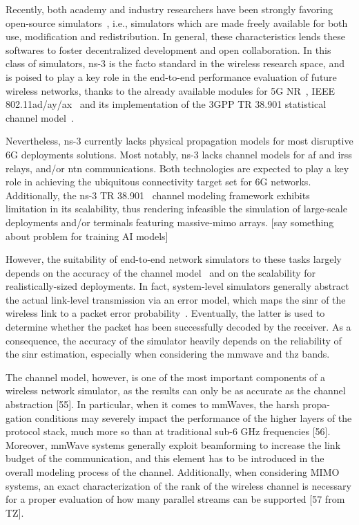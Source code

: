 Recently, both academy and industry researchers have been strongly favoring open-source simulators~\cite{10465179}, i.e., simulators which are made freely available for both use, modification and redistribution. In general, these characteristics lends these softwares to foster decentralized development and open collaboration.
In this class of simulators, ns-3 is the facto standard in the wireless research space, and is poised to play a key role in the end-to-end performance evaluation of future wireless networks, thanks to the already available modules for 5G NR~\cite{mezzavilla2018end, patriciello2019e2e}, IEEE 802.11ad/ay/ax~\cite{magrinValid2021, 10.1145/3460797.3460799, 7461452} and its implementation of the 3GPP TR 38.901 statistical channel model~\cite{zugno2020implementation}.

Nevertheless, ns-3 currently lacks physical propagation models for most disruptive 6G deployments solutions. Most notably, ns-3 lacks channel models for \gls{af} and \glspl{irs} relays, and/or \gls{ntn} communications. Both technologies are expected to play a key role in achieving the ubiquitous connectivity target set for 6G networks.
Additionally, the ns-3 TR 38.901~\cite{3gpp.38.901} channel modeling framework exhibits limitation in its scalability, thus rendering infeasible the simulation of large-scale deployments and/or terminals featuring massive-\gls{mimo} arrays. [say something about problem for training AI models]

However, the suitability of end-to-end network simulators to these tasks largely depends on the accuracy of the channel model~\cite{testolina2020scalable} and on the scalability for realistically-sized deployments.
In fact, system-level simulators generally abstract the actual link-level transmission via an error model, which maps the \gls{sinr} of the wireless link to a packet error probability~\cite{lagen2020new}. Eventually, the latter is used to determine whether the packet has been successfully decoded by the receiver. As a consequence, the accuracy of the simulator heavily depends on the reliability of the \gls{sinr} estimation, especially when considering the \gls{mmwave} and \gls{thz} bands. 

The channel model, however, is one of the most important components of a
wireless network simulator, as the results can only be as accurate as the channel
abstraction [55]. In particular, when it comes to mmWaves, the harsh propa-
gation conditions may severely impact the performance of the higher layers of
the protocol stack, much more so than at traditional sub-6 GHz frequencies [56].
Moreover, mmWave systems generally exploit beamforming to increase the link
budget of the communication, and this element has to be introduced in the overall
modeling process of the channel. Additionally, when considering MIMO systems,
an exact characterization of the rank of the wireless channel is necessary for a
proper evaluation of how many parallel streams can be supported [57 from TZ].


